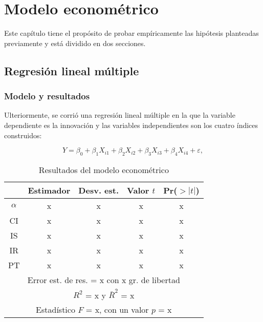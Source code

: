 \chapter{Modelo econométrico}

\noindent Este capítulo tiene el propósito de probar empíricamente las hipótesis planteadas previamente y está dividido en dos secciones.

\newpage

\section{Regresión lineal múltiple}

\subsection{Modelo y resultados}

\noindent Ulteriormente, se corrió una regresión lineal múltiple en la que la variable dependiente es la innovación y las variables independientes son los cuatro índices construidos: 
 
\begin{equation}
   Y = \beta_{0} + \beta_{1} X_{i1} + \beta_{2} X_{i2} + \beta_{3} X_{i3} + \beta_{4} X_{i4} +\varepsilon, \label{1}
\end{equation}


\begin{table}[H]
\centering
\caption{Resultados del modelo econométrico}
\label{REG}
\begin{tabular}{|ccccc|}
  \hline
 & Estimador & Desv. est. & Valor $t$ & Pr($>|t|$) \\ 
  \hline
  $\alpha$ & x & x & x & x \\ 
  CI & x & x & x & x \\ 
  IS & x & x & x & x \\ 
  IR & x & x & x & x \\ 
  PT & x & x & x & x \\ 
   \hline
\multicolumn{5}{|c|}{Error est. de res. = x con x gr. de libertad}
    \\
    \multicolumn{5}{|c|}{$R^2$ = x y $\bar{R}^2$ = x}
 \\
 \multicolumn{5}{|c|}{Estadístico $F$ = x, con un valor $p$ = x }
      \\
\hline
\end{tabular}

\end{table}
